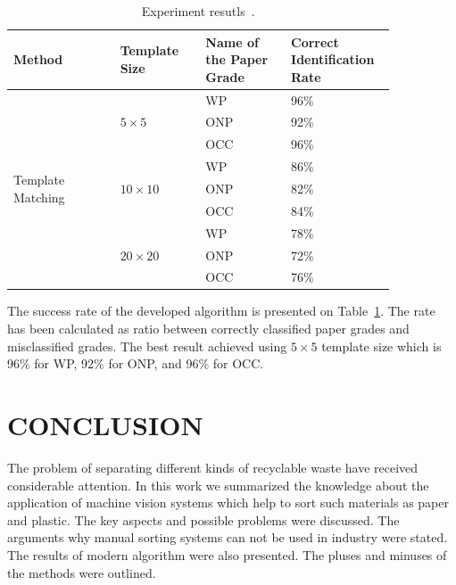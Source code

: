 \documentclass{lutmscthesis}[2010/09/22]
\begin{document}
\begin{table}[hpt]
\begin{center}
\caption{Experiment resutls~\cite{Rahman2009matching}.\label{tab:exper}}
{\renewcommand{\arraystretch}{2}
\begin{tabular}{|p{0.25\linewidth}|p{0.2\linewidth}|p{0.2\linewidth}|p{0.2\linewidth}|}

\hline
\textbf{Method}
&
\textbf{Template Size}
&
\textbf{Name of the Paper Grade}
&
\textbf{Correct Identification Rate} \\
\hline

\multirow{9}{*}{Template Matching}
&
\multirow{3}{*}{$5\times5$}
& WP & 96\% \\
\cline{3-4}

&& ONP & 92\% \\
\cline{3-4}

&& OCC & 96\% \\
\cline{2-4}

& \multirow{3}{*}{$10\times10$}
& WP & 86\% \\
\cline{3-4}

&& ONP & 82\% \\
\cline{3-4}

&& OCC & 84\% \\
\cline{2-4}

& \multirow{3}{*}{$20\times20$}
& WP & 78\% \\
\cline{3-4}

&& ONP & 72\% \\
\cline{3-4}

&& OCC & 76\% \\
\hline

\end{tabular}}
\end{center}
\end{table}

The success rate of the developed algorithm is presented on Table~\ref{tab:exper}. The
rate has been calculated as ratio between correctly classified paper grades and
misclassified grades. The best result achieved using $5 \times 5$ template size which
is 96\% for WP, 92\% for ONP, and 96\% for OCC.

\section{ CONCLUSION }
The problem of separating different kinds of recyclable waste have
received considerable attention. In this work we summarized
the knowledge about the application of machine vision systems which
help to sort such materials as paper and plastic. The key aspects and
possible problems were discussed. The arguments why
manual sorting systems can not be used in industry were stated. The results
of modern algorithm were also presented. The pluses and minuses
of the methods were outlined.


\end{document}

